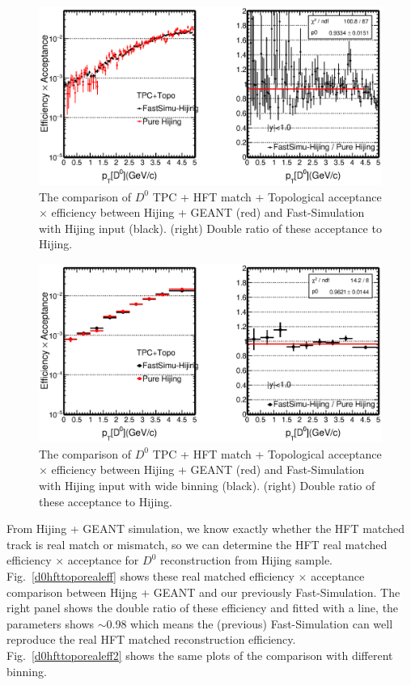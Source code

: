 \begin{figure}[htbp]
\centering
\includegraphics[keepaspectratio,width=1.0\textwidth,angle=0]{figure/Run14_D0HFT/Physics_FastHijingVsPureHijing_HFTTopo2.eps}
\caption{The comparison of $D^0$ TPC + HFT match + Topological acceptance $\times$ efficiency between Hijing + GEANT (red) and Fast-Simulation with Hijing input (black). (right) Double ratio of these acceptance to Hijing.}
\label{d0hfttopoeff}
\end{figure}

\begin{figure}[htbp]
\centering
\includegraphics[keepaspectratio,width=1.0\textwidth,angle=0]{figure/Run14_D0HFT/Physics_FastHijingVsPureHijing_HFTTopo.eps}
\caption{The comparison of $D^0$ TPC + HFT match + Topological acceptance $\times$ efficiency between Hijing + GEANT (red) and Fast-Simulation with Hijing input with wide binning (black). (right) Double ratio of these acceptance to Hijing.}
\label{d0hfttopoeff2}
\end{figure}

From Hijing + GEANT simulation, we know exactly whether the HFT matched track is real match or mismatch, so we can determine the HFT real matched efficiency $\times$ acceptance for $D^0$ reconstruction from Hijing sample. Fig.~\ref{d0hfttoporealeff} shows these real matched efficiency $\times$ acceptance comparison between Hijng + GEANT and our previously Fast-Simulation. The right panel shows the double ratio of these efficiency and fitted with a line, the parameters shows $\sim$0.98 which means the (previous) Fast-Simulation can well reproduce the real HFT matched reconstruction efficiency. Fig.~\ref{d0hfttoporealeff2} shows the same plots of the comparison with different binning. 

